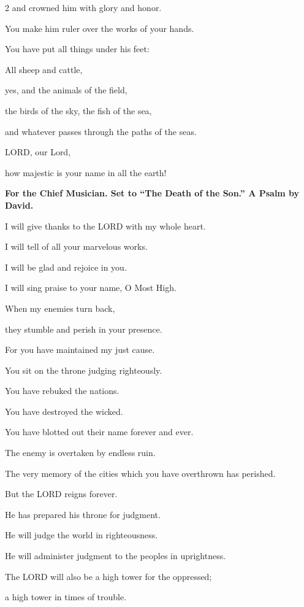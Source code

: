 \begin{multicols}{2}
	and crowned him with glory and honor.
	
	
	\myverse{}You make him ruler over the works of your hands.
	
	You have put all things under his feet:
	
	
	\myverse{}All sheep and cattle,
	
	yes, and the animals of the field,
	
	
	\myverse{}the birds of the sky, the fish of the sea,
	
	and whatever passes through the paths of the seas.
	
	
	\myverse{}LORD, our Lord,
	
	how majestic is your name in all the earth!	
	
	\mychapter{}\textbf{For the Chief Musician. Set to “The Death of the Son.” A Psalm by David.}
	
	\myverse*{}I will give thanks to the LORD with my whole heart.
	
	I will tell of all your marvelous works.
	
	
	\myverse{}I will be glad and rejoice in you.
	
	I will sing praise to your name, O Most High.
	
	
	\myverse{}When my enemies turn back,
	
	they stumble and perish in your presence.
	
	
	\myverse{}For you have maintained my just cause.
	
	You sit on the throne judging righteously.
	
	
	\myverse{}You have rebuked the nations.
	
	You have destroyed the wicked.
	
	You have blotted out their name forever and ever.
	
	
	\myverse{}The enemy is overtaken by endless ruin.
	
	The very memory of the cities which you have overthrown has perished.
	
	
	\myverse{}But the LORD reigns forever.
	
	He has prepared his throne for judgment.
	
	
	\myverse{}He will judge the world in righteousness.
	
	He will administer judgment to the peoples in uprightness.
	
	
	\myverse{}The LORD will also be a high tower for the oppressed;
	
	a high tower in times of trouble.
	

\end{multicols}
